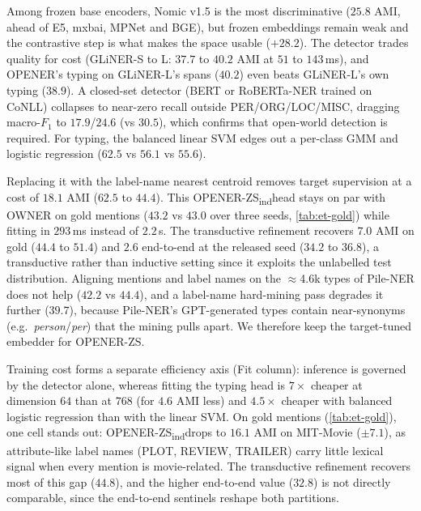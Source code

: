 \documentclass[pdflatex,sn-basic,Numbered]{sn-jnl}
\newcommand{\zsind}{OPENER-ZS\textsubscript{ind}}
\begin{document}
{
Among frozen base encoders, Nomic v1.5 is the most discriminative ($25.8$ AMI, ahead of E5, mxbai, MPNet and BGE), but frozen embeddings remain weak and the contrastive step is what makes the space usable ($+28.2$).
The detector trades quality for cost (GLiNER-S to L: $37.7$ to $40.2$ AMI at $51$ to $143$\,ms), and OPENER's typing on GLiNER-L's spans ($40.2$) even beats GLiNER-L's own typing ($38.9$).
A closed-set detector (BERT or RoBERTa-NER trained on CoNLL) collapses to near-zero recall outside PER/ORG/LOC/MISC, dragging macro-$F_1$ to $17.9$/$24.6$ (vs $30.5$), which confirms that open-world detection is required.
For typing, the balanced linear SVM edges out a per-class GMM and logistic regression ($62.5$ vs $56.1$ vs $55.6$).

Replacing it with the label-name nearest centroid removes target supervision at a cost of $18.1$ AMI ($62.5$ to $44.4$). This \zsind head stays on par with OWNER on gold mentions ($43.2$ vs $43.0$ over three seeds, \autoref{tab:et-gold}) while fitting in $293$\,ms instead of $2.2$\,s.
The transductive refinement recovers $7.0$ AMI on gold ($44.4$ to $51.4$) and $2.6$ end-to-end at the released seed ($34.2$ to $36.8$), a transductive rather than inductive setting since it exploits the unlabelled test distribution.
Aligning mentions and label names on the $\approx$4.6k types of Pile-NER \cite{zhou2024universalner} does not help ($42.2$ vs $44.4$), and a label-name hard-mining pass degrades it further ($39.7$), because Pile-NER's GPT-generated types contain near-synonyms (e.g.\ \emph{person}/\emph{per}) that the mining pulls apart. We therefore keep the target-tuned embedder for OPENER-ZS.

Training cost forms a separate efficiency axis (Fit column): inference is governed by the detector alone, whereas fitting the typing head is $7\times$ cheaper at dimension $64$ than at $768$ (for $4.6$ AMI less) and $4.5\times$ cheaper with balanced logistic regression than with the linear SVM.
On gold mentions (\autoref{tab:et-gold}), one cell stands out: \zsind drops to $16.1$ AMI on MIT-Movie ($\pm 7.1$), as attribute-like label names (PLOT, REVIEW, TRAILER) carry little lexical signal when every mention is movie-related. The transductive refinement recovers most of this gap ($44.8$), and the higher end-to-end value ($32.8$) is not directly comparable, since the end-to-end sentinels reshape both partitions.
\par}
\end{document}
